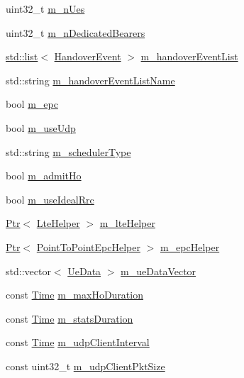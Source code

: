 \begin{DoxyCompactItemize}
\item 
uint32\+\_\+t \hyperlink{classLteX2HandoverTestCase_a31a9b7786b2204ed8cc910fe0aae6307}{m\+\_\+n\+Ues}
\item 
uint32\+\_\+t \hyperlink{classLteX2HandoverTestCase_af2146e1a8c7985f642c7fb69ad7ec345}{m\+\_\+n\+Dedicated\+Bearers}
\item 
\hyperlink{openflow-interface_8h_afd9bcfa176617760671b67580f536fa7}{std\+::list}$<$ \hyperlink{structHandoverEvent}{Handover\+Event} $>$ \hyperlink{classLteX2HandoverTestCase_ad6fb6a23499cc9ac5ac3d60dd6a66dbf}{m\+\_\+handover\+Event\+List}
\item 
std\+::string \hyperlink{classLteX2HandoverTestCase_a3473a824d293d99f2da2f3aa30800aca}{m\+\_\+handover\+Event\+List\+Name}
\item 
bool \hyperlink{classLteX2HandoverTestCase_ab6f7642cff4af84c7ba6a21388ee845e}{m\+\_\+epc}
\item 
bool \hyperlink{classLteX2HandoverTestCase_a70c8ee7faf2c84d6bad133cca4665fb4}{m\+\_\+use\+Udp}
\item 
std\+::string \hyperlink{classLteX2HandoverTestCase_a37c1896a069311a7bcd63b536aedef81}{m\+\_\+scheduler\+Type}
\item 
bool \hyperlink{classLteX2HandoverTestCase_ab4ea238434f2750bde6a599448968c81}{m\+\_\+admit\+Ho}
\item 
bool \hyperlink{classLteX2HandoverTestCase_a3a6c8e1e087766873c9ff712fdedc9d4}{m\+\_\+use\+Ideal\+Rrc}
\item 
\hyperlink{classns3_1_1Ptr}{Ptr}$<$ \hyperlink{classns3_1_1LteHelper}{Lte\+Helper} $>$ \hyperlink{classLteX2HandoverTestCase_afa4987b8bd9d1c3062f7705ef808be18}{m\+\_\+lte\+Helper}
\item 
\hyperlink{classns3_1_1Ptr}{Ptr}$<$ \hyperlink{classns3_1_1PointToPointEpcHelper}{Point\+To\+Point\+Epc\+Helper} $>$ \hyperlink{classLteX2HandoverTestCase_a17d20243fe4f7a49fe7fa1eeeff9f1f5}{m\+\_\+epc\+Helper}
\item 
std\+::vector$<$ \hyperlink{structLteX2HandoverTestCase_1_1UeData}{Ue\+Data} $>$ \hyperlink{classLteX2HandoverTestCase_a502c382f8e49ffd33916d0fb4a3002bd}{m\+\_\+ue\+Data\+Vector}
\item 
const \hyperlink{classns3_1_1Time}{Time} \hyperlink{classLteX2HandoverTestCase_acae0303890a3af28ee8a30c6528c7dfc}{m\+\_\+max\+Ho\+Duration}
\item 
const \hyperlink{classns3_1_1Time}{Time} \hyperlink{classLteX2HandoverTestCase_a3ddcbe6ad49c9ec5ead6c12f830c350f}{m\+\_\+stats\+Duration}
\item 
const \hyperlink{classns3_1_1Time}{Time} \hyperlink{classLteX2HandoverTestCase_af7c37f7d9c2ee0ca117956c998548538}{m\+\_\+udp\+Client\+Interval}
\item 
const uint32\+\_\+t \hyperlink{classLteX2HandoverTestCase_a395f2887d4796000ee5ec156bd59ee3d}{m\+\_\+udp\+Client\+Pkt\+Size}
\end{DoxyCompactItemize}
